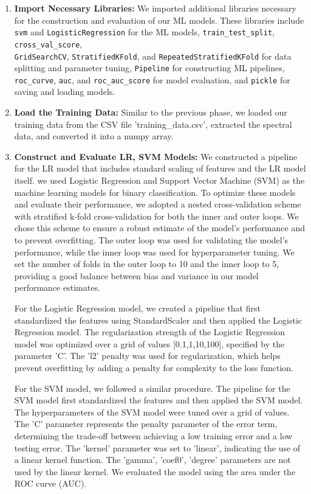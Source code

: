 \documentclass{cernatsnote}
\begin{document}
\begin{enumerate}
\item \textbf{Import Necessary Libraries:} We imported additional libraries necessary for the construction and evaluation of our ML models. These libraries include \texttt{svm} and \texttt{LogisticRegression} for the ML models, \texttt{train\_test\_split}, \texttt{cross\_val\_score},\\ \texttt{GridSearchCV}, \texttt{StratifiedKFold}, and \texttt{RepeatedStratifiedKFold} for data splitting and parameter tuning, \texttt{Pipeline} for constructing ML pipelines, \texttt{roc\_curve}, \texttt{auc}, and \texttt{roc\_auc\_score} for model evaluation, and \texttt{pickle} for saving and loading models.

\item \textbf{Load the Training Data:} Similar to the previous phase, we loaded our training data from the CSV file 'training\_data.csv', extracted the spectral data, and converted it into a numpy array.


\item \textbf{Construct and Evaluate LR, SVM Models:} We constructed a pipeline for the LR model that includes standard scaling of features and the LR model itself. we used Logistic Regression and Support Vector Machine (SVM) as the machine learning models for binary classification. To optimize these models and evaluate their performance, we adopted a nested cross-validation scheme with stratified k-fold cross-validation for both the inner and outer loops. We chose this scheme to ensure a robust estimate of the model's performance and to prevent overfitting. The outer loop was used for validating the model's performance, while the inner loop was used for hyperparameter tuning. We set the number of folds in the outer loop to 10 and the inner loop to 5, providing a good balance between bias and variance in our model performance estimates.

For the Logistic Regression model, we created a pipeline that first standardized the features using StandardScaler and then applied the Logistic Regression model. The regularization strength of the Logistic Regression model was optimized over a grid of values [0.1,1,10,100], specified by the parameter 'C'. The 'l2' penalty was used for regularization, which helps prevent overfitting by adding a penalty for complexity to the loss function.

For the SVM model, we followed a similar procedure. The pipeline for the SVM model first standardized the features and then applied the SVM model. The hyperparameters of the SVM model were tuned over a grid of values. The 'C' parameter represents the penalty parameter of the error term, determining the trade-off between achieving a low training error and a low testing error. The 'kernel' parameter was set to 'linear', indicating the use of a linear kernel function. The 'gamma', 'coef0', 'degree' parameters are not used by the linear kernel. We evaluated the model using the area under the ROC curve (AUC).


\end{enumerate}
\end{document}
